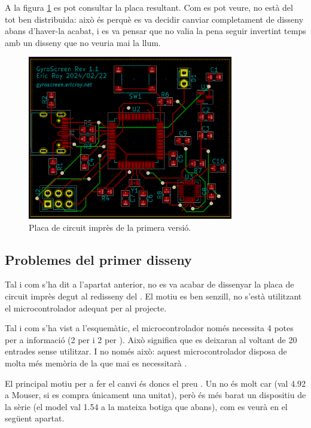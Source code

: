 A la figura \ref{fig:pcb_v1} es pot consultar la placa resultant. Com es pot veure,
no està del tot ben distribuida: això és perquè es va decidir canviar completament
de disseny abans d'haver-la acabat, i es va pensar que no valia la pena seguir
invertint temps amb un disseny que no veuria mai la llum.

\begin{figure}[ht]
    \centering
    \includegraphics[width=0.8\textwidth]{images/kicad/gyro1_pcb.png}
    \caption{Placa de circuit imprès de la primera versió.}
    \label{fig:pcb_v1}
\end{figure}

\subsection{Problemes del primer disseny}

Tal i com s'ha dit a l'apartat anterior, no es va acabar de dissenyar la placa
de circuit imprès degut al redisseny del . El motiu es ben senzill,
no s'està utilitzant el microcontrolador adequat per al projecte.

Tal i com s'ha vist a l'esquemàtic, el microcontrolador només necessita 4 potes
per a informació (2 per  i 2 per ). Això significa que es
deixaran al voltant de 20 entrades sense utilitzar. I no només això: aquest
microcontrolador disposa de molta més memòria de la que mai es necessitarà
\cite{AtMega32u4}.

El principal motiu per a fer el canvi és doncs el preu \cite{AvrComparison}.
Un  no és molt car (val \SI{4.92}{\EUR} a Mouser, si es compra
únicament una unitat), però és més barat un dispositiu  de la sèrie
 (el model  val \SI{1.54}{\EUR} a la mateixa
botiga que abans), com es veurà en el següent apartat.

